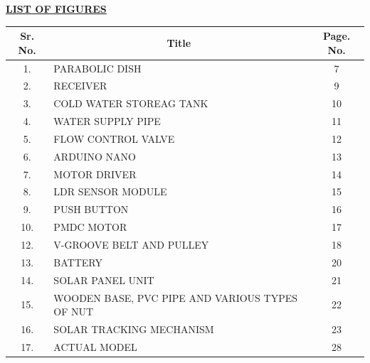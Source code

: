 \vspace*{-2mm}
\begin{center}
  {\fontsize{16}{20}\selectfont \bfseries \textcolor{red!80!black}{\underline{LIST OF FIGURES}}}\\[6mm]
\end{center}

\begin{center}
\renewcommand{\arraystretch}{1.28}
\begin{tabular}{|c|p{80mm}|c|}
\hline
\rowcolor{gray!20}
\textbf{Sr. No.} & \multicolumn{1}{c|}{\textbf{Title}} & \textbf{Page. No.} \\
\hline
1. & PARABOLIC DISH & 7 \\
\hline
2. & RECEIVER & 9 \\
\hline
3. & COLD WATER STOREAG TANK & 10 \\
\hline
4. & WATER SUPPLY PIPE & 11 \\
\hline
5. & FLOW CONTROL VALVE & 12 \\
\hline
6. & ARDUINO NANO & 13 \\
\hline
7. & MOTOR DRIVER & 14 \\
\hline
8. & LDR SENSOR MODULE & 15 \\
\hline
9. & PUSH BUTTON & 16 \\
\hline
10. & PMDC MOTOR & 17 \\
\hline
12. & V-GROOVE BELT AND PULLEY & 18 \\
\hline
13. & BATTERY & 20 \\
\hline
14. & SOLAR PANEL UNIT & 21 \\
\hline
15. & WOODEN BASE, PVC PIPE AND VARIOUS TYPES OF NUT & 22 \\
\hline
16. & SOLAR TRACKING MECHANISM & 23 \\
\hline
17. & ACTUAL MODEL & 28 \\
\hline
\end{tabular}
\end{center}
\clearpage
